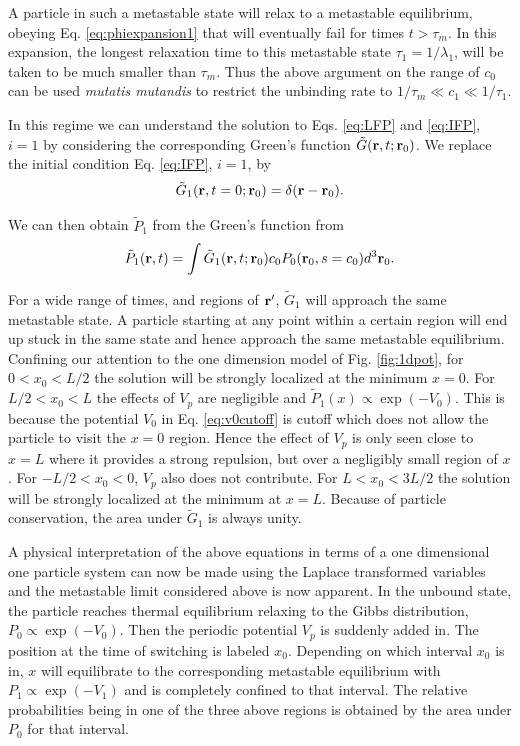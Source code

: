 \documentclass[11pt]{ucthesis}
\def\br{{\bf r}}
\begin{document}
A particle in such a metastable state will relax to a metastable equilibrium,
obeying Eq. \ref{eq:phiexpansion1} that will eventually fail for times $t >
\tau_m$. In this expansion, the longest relaxation time to this metastable state
$\tau_1 = 1/\lambda_1$,
will be taken to be much smaller than $\tau_m$. Thus the above argument on the
range of $c_0$ can be used {\em mutatis mutandis} to restrict
the unbinding rate to $1/\tau_m \ll c_1 \ll 1/\tau_1.$

In this regime we can understand the solution to  Eqs. \ref{eq:LFP} and \ref{eq:IFP}, $i=1$ 
by considering the corresponding Green's function $\tilde{G}(\br,t;\br_0)$. We replace the initial
condition Eq. \ref{eq:IFP}, $i=1$, by 
\begin{equation}
\label{eq:GIFP} 
\tilde{G}_1(\br,t=0;\br_0) = \delta(\br-\br_0) . 
\end{equation}

We can then obtain $\tilde{P}_1$ from the Green's function from
\begin{equation}
\label{eq:P1intGP0}
\tilde{P}_1(\br,t) = \int \tilde{G}_1(\br,t;\br_0) c_0 P_0(\br_0, s = c_0) d^3\br_0 .
\end{equation}

For a wide range of times, and regions of $\br'$, $\tilde{G}_1$ will approach the same
metastable state. A particle starting at any point within a certain region will
end up stuck in the same state and hence approach the same metastable equilibrium. 
Confining our attention to the one dimension model of Fig.
\ref{fig:1dpot}, for $0 < x_0 < L/2$ the solution will be strongly localized at
the minimum $x=0$. For $L/2 < x_0 < L$ the effects of $V_p$ are negligible
and $\tilde{P}_1(x) \propto \exp(-V_0)$. This is because the potential $V_0$ 
in Eq. \ref{eq:v0cutoff} is cutoff which does not allow the particle to visit
the $x=0$ region. Hence the effect of $V_p$ is only seen close to $x=L$ where
it provides a strong repulsion, but over a negligibly small region of $x$.
For $-L/2 < x_0 < 0$, $V_p$ also does not contribute.
For $L < x_0 < 3L/2$ the solution will be strongly localized at
the minimum at $x=L$. Because of particle conservation, the area under
$\tilde{G}_1$ is always unity.

A physical interpretation of the above equations in terms of a one dimensional one particle system 
can now be made using the Laplace transformed
variables and the metastable limit considered above is now apparent.
In the unbound state, the
particle reaches thermal equilibrium relaxing to the Gibbs
distribution, $P_0 \propto \exp(-V_0)$. Then the periodic potential $V_p$ is suddenly
added in. The position at the time of switching is labeled $x_0$. Depending
on which interval $x_0$ is in, $x$ will equilibrate to the corresponding
metastable equilibrium with $P_1 \propto \exp(-V_1)$ and is completely confined to
that interval. The relative probabilities
being in one of the three above regions is obtained by the area under $P_0$ for
that interval.
\end{document}
